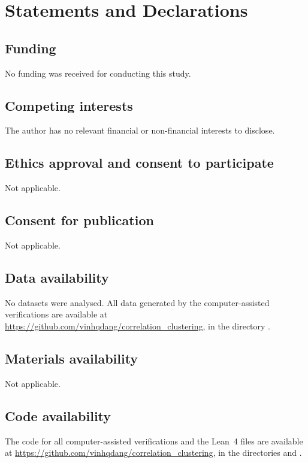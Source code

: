 \documentclass[pdflatex,sn-mathphys-num]{sn-jnl}
\theoremstyle{thmstyleone}
\theoremstyle{thmstylethree}
\begin{document}










\backmatter


\section*{Statements and Declarations}

\subsection*{Funding}
No funding was received for conducting this study.

\subsection*{Competing interests}
The author has no relevant financial or non-financial interests to disclose.

\subsection*{Ethics approval and consent to participate}
Not applicable.

\subsection*{Consent for publication}
Not applicable.

\subsection*{Data availability}
No datasets were analysed. All data generated by the computer-assisted verifications are available at \url{https://github.com/vinhqdang/correlation_clustering}, in the directory .

\subsection*{Materials availability}
Not applicable.

\subsection*{Code availability}
The code for all computer-assisted verifications and the Lean~4 files are available at \url{https://github.com/vinhqdang/correlation_clustering}, in the directories  and .
\end{document}
